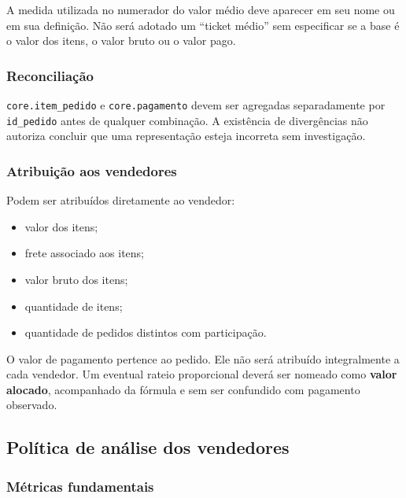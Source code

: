 \documentclass[12pt,a4paper]{article}
\providecommand{\tightlist}{
  \setlength{\itemsep}{0pt}\setlength{\parskip}{0pt}
}
\begin{document}
A medida utilizada no numerador do valor médio deve aparecer em seu nome
ou em sua definição. Não será adotado um ``ticket médio'' sem
especificar se a base é o valor dos itens, o valor bruto ou o valor
pago.

\subsubsection{Reconciliação}\label{docs__analytics__contrato_analitico.md__reconciliauxe7uxe3o}

\nolinkurl{core.item_pedido} e \nolinkurl{core.pagamento} devem ser
agregadas separadamente por \nolinkurl{id_pedido} antes de qualquer
combinação. A existência de divergências não autoriza concluir que uma
representação esteja incorreta sem investigação.

\subsubsection{Atribuição aos
vendedores}\label{docs__analytics__contrato_analitico.md__atribuiuxe7uxe3o-aos-vendedores}

Podem ser atribuídos diretamente ao vendedor:

\begin{itemize}
\tightlist
\item
  valor dos itens;
\item
  frete associado aos itens;
\item
  valor bruto dos itens;
\item
  quantidade de itens;
\item
  quantidade de pedidos distintos com participação.
\end{itemize}

O valor de pagamento pertence ao pedido. Ele não será atribuído
integralmente a cada vendedor. Um eventual rateio proporcional deverá
ser nomeado como \textbf{valor alocado}, acompanhado da fórmula e sem
ser confundido com pagamento observado.

\subsection{Política de análise dos
vendedores}\label{docs__analytics__contrato_analitico.md__poluxedtica-de-anuxe1lise-dos-vendedores}

\subsubsection{Métricas
fundamentais}\label{docs__analytics__contrato_analitico.md__muxe9tricas-fundamentais}
\end{document}
